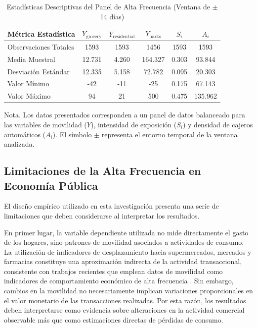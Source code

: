 \begin{table}[H]
    \centering
    \caption{Estad\'isticas Descriptivas del Panel de Alta Frecuencia (Ventana de $\pm$14 d\'ias)}
    \label{tab:descriptivas}
    \small
    \begin{tabular}{lccccc}
        \toprule
        M\'etrica Estad\'istica & $Y_{\text{grocery}}$ & $Y_{\text{residential}}$ & $Y_{\text{parks}}$ & $S_i$ & $A_i$ \\
        \midrule
        Observaciones Totales & 1593 & 1593 & 1456 & 1593 & 1593 \\
        Media Muestral        & 12.731   & 4.260    & 164.327  & 0.303    & 93.844   \\
        Desviaci\'on Est\'andar & 12.335   & 5.158    & 72.782   & 0.095    & 20.303   \\
        Valor M\'inimo        & -42  & -11  & -25  & 0.175    & 67.143   \\
        Valor M\'aximo        & 94   & 21   & 500  & 0.475    & 135.962  \\
        \bottomrule
    \end{tabular}
    \vspace{0.15cm}
    \begin{flushleft}
    \small{Nota. Los datos presentados corresponden a un panel de datos balanceado para las variables de movilidad ($Y$), intensidad de exposici\'on ($S_i$) y densidad de cajeros autom\'aticos ($A_i$). El s\'imbolo $\pm$ representa el entorno temporal de la ventana analizada.}
    \end{flushleft}
\end{table}


\subsection{Limitaciones de la Alta Frecuencia en Econom\'ia P\'ublica}
\label{sec:3_2}

El dise\~no emp\'irico utilizado en esta investigaci\'on presenta una serie de 
limitaciones que deben considerarse al interpretar los resultados.

En primer lugar, la variable dependiente utilizada no mide directamente el gasto 
de los hogares, sino patrones de movilidad asociados a actividades de consumo. 
La utilizaci\'on de indicadores de desplazamiento hacia supermercados, mercados 
y farmacias constituye una aproximaci\'on indirecta de la actividad transaccional, 
consistente con trabajos recientes que emplean datos de movilidad como 
indicadores de comportamiento econ\'omico de alta frecuencia \citep{chetty2020economic, 
bounie2020consumers}. Sin embargo, cambios en la movilidad no necesariamente implican 
variaciones proporcionales en el valor monetario de las transacciones realizadas. 
Por esta raz\'on, los resultados deben interpretarse como evidencia sobre 
alteraciones en la actividad comercial observable m\'as que como estimaciones 
directas de p\'erdidas de consumo.

